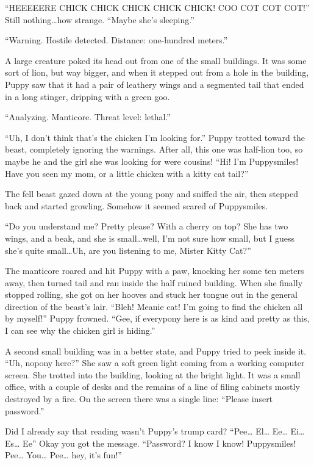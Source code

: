 ``HEEEEERE CHICK CHICK CHICK CHICK CHICK! COO COT COT COT!'' Still nothing\dots how strange. ``Maybe she's sleeping.''

{\mt ``Warning. Hostile detected. Distance: one-hundred meters.''}

A large creature poked its head out from one of the small buildings. It was some sort of lion, but way bigger, and when it stepped out from a hole in the building, Puppy saw that it had a pair of leathery wings and a segmented tail that ended in a long stinger, dripping with a green goo.

{\mt ``Analyzing. Manticore. Threat level: lethal.''}

``Uh, I don't think that's the chicken I'm looking for.'' Puppy trotted toward the beast, completely ignoring the warnings. After all, this one was half-lion too, so maybe he and the girl she was looking for were cousins! ``Hi! I'm Puppysmiles! Have you seen my mom, or a little chicken with a kitty cat tail?''

The fell beast gazed down at the young pony and sniffed the air, then stepped back and started growling. Somehow it seemed scared of Puppysmiles.

``Do you understand me? Pretty please? With a cherry on top? She has two wings, and a beak, and she is small\dots well, I'm not sure how small, but I guess she's quite small\dots Uh, are you listening to me, Mister Kitty Cat?''

The manticore roared and hit Puppy with a paw, knocking her some ten meters away, then turned tail and ran inside the half ruined building. When she finally stopped rolling, she got on her hooves and stuck her tongue out in the general direction of the beast's lair. ``Bleh! Meanie cat! I'm going to find the chicken all by myself!'' Puppy frowned. ``Gee, if everypony here is as kind and pretty as this, I can see why the chicken girl is hiding.''

A second small building was in a better state, and Puppy tried to peek inside it. ``Uh, nopony here?'' She saw a soft green light coming from a working computer screen. She trotted into the building, looking at the bright light. It was a small office, with a couple of desks and the remains of a line of filing cabinets mostly destroyed by a fire. On the screen there was a single line: ``Please insert password.''

Did I already say that reading wasn't Puppy's trump card? ``Pee\dots{} El\dots{} Ee\dots{} Ei\dots{} Es\dots{} Ee'' Okay you got the message. ``Password? I know I know! Puppysmiles! Pee\dots{} You\dots{} Pee\dots{} hey, it's fun!''

